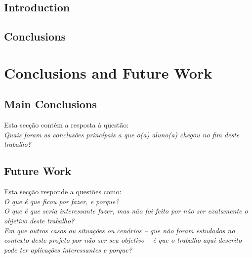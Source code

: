 \documentclass[titlepage,12pt,a4paper,times]{book}
\begin{document}
\section{Introduction}
\label{chap4:sec:intro}

\section{}
\label{chap4:sec:...}

\section{Conclusions}
\label{chap4:sec:concs}

\chapter{Conclusions and Future Work}
\label{chap:cfw}

\section{Main Conclusions}
\label{sec:main-conc}

Esta secção contém a resposta à questão: \\
\emph{Quais foram as conclusões princípais a que o(a) aluno(a) chegou no fim
deste trabalho?}

\section{Future Work}
\label{sec:future-work}

Esta secção responde a questões como:\\
\emph{O que é que ficou por fazer, e porque?}\\
\emph{O que é que seria interessante fazer, mas não foi feito por não ser
exatamente o objetivo deste trabalho?}\\
\emph{Em que outros casos ou situações ou cenários -- que não foram estudados
no contexto deste projeto por não ser seu objetivo -- é que o trabalho aqui
descrito pode ter aplicações interessantes e porque?}

% 
% 
% 
% 

\backmatter



\end{document}
